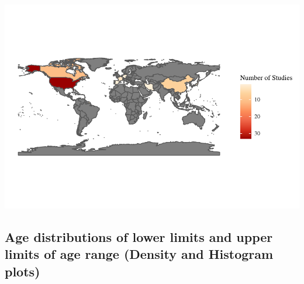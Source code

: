 \documentclass[
]{article}
\begin{document}
\includegraphics[width=1\linewidth]{man/figures/README-choropleth_study_count-1}

\hypertarget{age-distributions-of-lower-limits-and-upper-limits-of-age-range-density-and-histogram-plots}{%
\subsection{Age distributions of lower limits and upper limits of age
range (Density and Histogram
plots)}\label{age-distributions-of-lower-limits-and-upper-limits-of-age-range-density-and-histogram-plots}}
\end{document}
